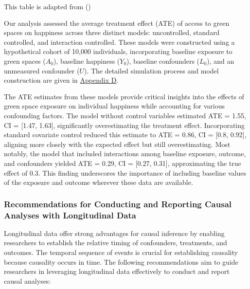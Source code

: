\documentclass[
  single column]{article}
\begin{document}
\begin{table}

\caption{\label{tbl-lg}This table is adapted from
()}

\centering{

\examplelongitudinal

}

\end{table}%

Our analysis assessed the average treatment effect (ATE) of access to
green spaces on happiness across three distinct models: uncontrolled,
standard controlled, and interaction controlled. These models were
constructed using a hypothetical cohort of 10,000 individuals,
incorporating baseline exposure to green spaces (\(A_0\)), baseline
happiness (\(Y_0\)), baseline confounders (\(L_0\)), and an unmeasured
confounder (\(U\)). The detailed simulation process and model
construction are given in
\hyperref[appendix-simulate-longitudinal-ate]{Appendix D}.

The ATE estimates from these models provide critical insights into the
effects of green space exposure on individual happiness while accounting
for various confounding factors. The model without control variables
estimated ATE = 1.55, CI = {[}1.47, 1.63{]}, significantly
overestimating the treatment effect. Incorporating standard covariate
control reduced this estimate to ATE = 0.86, CI = {[}0.8, 0.92{]},
aligning more closely with the expected effect but still overestimating.
Most notably, the model that included interactions among baseline
exposure, outcome, and confounders yielded ATE = 0.29, CI = {[}0.27,
0.31{]}, approximating the true effect of 0.3. This finding underscores
the importance of including baseline values of the exposure and outcome
wherever these data are available.

\subsubsection{Recommendations for Conducting and Reporting Causal
Analyses with Longitudinal
Data}\label{recommendations-for-conducting-and-reporting-causal-analyses-with-longitudinal-data}

Longitudinal data offer strong advantages for causal inference by
enabling researchers to establish the relative timing of confounders,
treatments, and outcomes. The temporal sequence of events is crucial for
establishing causality because causality occurs in time. The following
recommendations aim to guide researchers in leveraging longitudinal data
effectively to conduct and report causal analyses:
\end{document}
